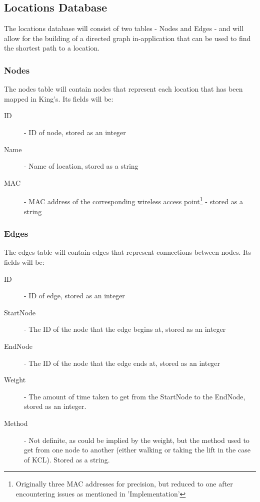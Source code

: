 \documentclass[11pt]{informatics-report}
\begin{document}
\subsection{Locations Database}

The locations database will consist of two tables - Nodes and Edges - and will allow for the building of a directed graph in-application that can be used to find the shortest path to a location.

\subsubsection{Nodes}

The nodes table will contain nodes that represent each location that has been mapped in King's. Its fields will be: 

\begin{description}
\item[ID] - ID of node, stored as an integer
\item[Name] - Name of location, stored as a string
\item[MAC] - MAC address of the corresponding wireless access point\footnote{Originally three MAC addresses for precision, but reduced to one after encountering issues as mentioned in 'Implementation'} - stored as a string
\end{description}

\subsubsection{Edges}

The edges table will contain edges that represent connections between nodes. Its fields will be:

\begin{description}
\item[ID] - ID of edge, stored as an integer
\item[StartNode] - The ID of the node that the edge begins at, stored as an integer
\item[EndNode] - The ID of the node that the edge ends at, stored as an integer
\item[Weight] - The amount of time taken to get from the StartNode to the EndNode, stored as an integer.
\item[Method] - Not definite, as could be implied by the weight, but the method used to get from one node to another (either walking or taking the lift in the case of KCL). Stored as a string. 
\end{description}
\end{document}
